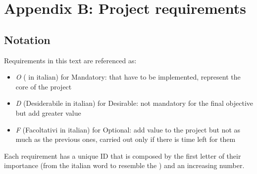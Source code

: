 \renewcommand\thechapter{B}
\chapter{Appendix B: Project requirements}
\label{AppendixB}

\section{Notation}
	Requirements in this text are referenced as:
	\begin{itemize}
		\item \textit{O} ( in italian) for Mandatory: that have to be implemented, represent the core of the project
		\item \textit{D} (Desiderabile in italian) for Desirable: not mandatory for the final objective but add greater value
		\item \textit{F} (Facoltativi in italian) for Optional: add value to the project but not as much as the previous ones, carried out only if there is time left for them
	\end{itemize}
	Each requirement has a unique ID that is composed by the first letter of their importance (from the italian word to resemble the ) and an increasing number.

\newpage
